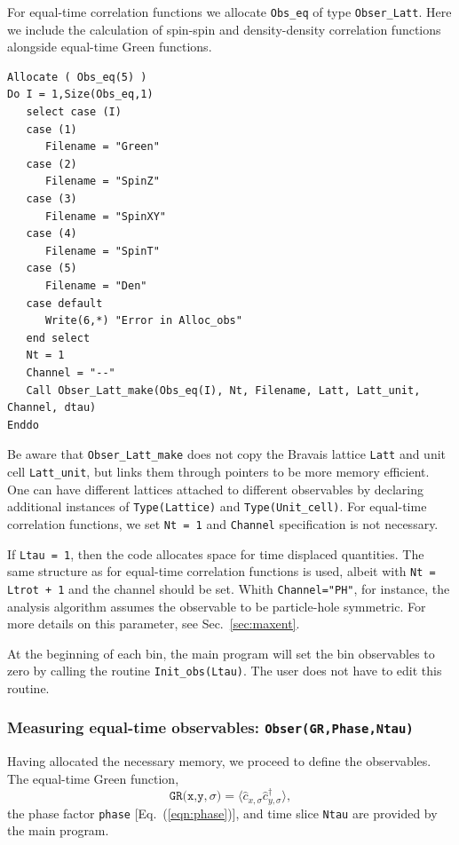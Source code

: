 For equal-time correlation functions  we allocate  \texttt{Obs\_eq}  of type \texttt{Obser\_Latt}.  Here we include the calculation of spin-spin and density-density correlation functions alongside equal-time Green functions. 
\begin{lstlisting}[style=fortran]
Allocate ( Obs_eq(5) )
Do I = 1,Size(Obs_eq,1)
   select case (I)
   case (1)
      Filename = "Green"
   case (2)
      Filename = "SpinZ"
   case (3)
      Filename = "SpinXY"
   case (4)
      Filename = "SpinT"
   case (5)
      Filename = "Den"
   case default
      Write(6,*) "Error in Alloc_obs"
   end select
   Nt = 1
   Channel = "--"
   Call Obser_Latt_make(Obs_eq(I), Nt, Filename, Latt, Latt_unit, Channel, dtau)
Enddo
\end{lstlisting} 
Be aware that \texttt{Obser\_Latt\_make} does not copy the Bravais lattice \texttt{Latt} 
and unit cell \texttt{Latt\_unit}, but links them through pointers to be more memory 
efficient. One can have different lattices attached to different observables by declaring 
additional instances of \texttt{Type(Lattice)} and \texttt{Type(Unit\_cell)}.
 For equal-time correlation functions, we set \texttt{Nt = 1} and \texttt{Channel} specification is not necessary.

If \texttt{Ltau = 1}, then the code allocates space for time displaced quantities. The 
same structure as for equal-time correlation functions is used, albeit with 
\texttt{Nt = Ltrot + 1} and the channel should be set. Whith \texttt{Channel="PH"}, for instance, the analysis algorithm assumes the observable to be particle-hole symmetric. For more details on this parameter, see Sec.~\ref{sec:maxent}.

At the beginning of each bin, the main program will set the bin observables to zero by calling  the routine \texttt{Init\_obs(Ltau)}. The user does not have to edit this routine. 
 
\subsubsection[Measuring equal-time observables: \texttt{Obser}]{Measuring equal-time observables: \texttt{Obser(GR,Phase,Ntau)}} \label{sec:EqualTimeobs}

Having allocated the necessary memory, we proceed to define the observables. The equal-time  Green function,
\begin{equation}
	 \texttt{GR(x,y},\sigma{\texttt)}  = \langle \hat{c}^{\phantom{\dagger}}_{x,\sigma} \hat{c}^{\dagger}_{y,\sigma}  \rangle,
\end{equation}
the  phase factor \texttt{phase} [Eq.~(\ref{eqn:phase})], and time slice \texttt{Ntau}   are provided by the main program.  

